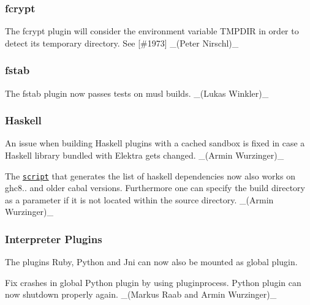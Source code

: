 \subsubsection*{fcrypt}


\begin{DoxyItemize}
\item The {\ttfamily fcrypt} plugin will consider the environment variable {\ttfamily T\+M\+P\+D\+IR} in order to detect its temporary directory. See \mbox{[}\#1973\mbox{]} \+\_\+(\+Peter Nirschl)\+\_\+
\end{DoxyItemize}

\subsubsection*{fstab}


\begin{DoxyItemize}
\item The {\ttfamily fstab} plugin now passes tests on musl builds. \+\_\+(\+Lukas Winkler)\+\_\+
\end{DoxyItemize}

\subsubsection*{Haskell}


\begin{DoxyItemize}
\item An issue when building Haskell plugins with a cached sandbox is fixed in case a Haskell library bundled with Elektra gets changed. \+\_\+(\+Armin Wurzinger)\+\_\+
\item The \href{https://master.libelektra.org/scripts/generate-haskell-dependencies}{\tt script} that generates the list of haskell dependencies now also works on ghc8.. and older cabal versions. Furthermore one can specify the build directory as a parameter if it is not located within the source directory. \+\_\+(\+Armin Wurzinger)\+\_\+
\end{DoxyItemize}

\subsubsection*{Interpreter Plugins}


\begin{DoxyItemize}
\item The plugins Ruby, Python and Jni can now also be mounted as global plugin.
\item Fix crashes in global Python plugin by using pluginprocess. Python plugin can now shutdown properly again. \+\_\+(\+Markus Raab and Armin Wurzinger)\+\_\+
\end{DoxyItemize}

